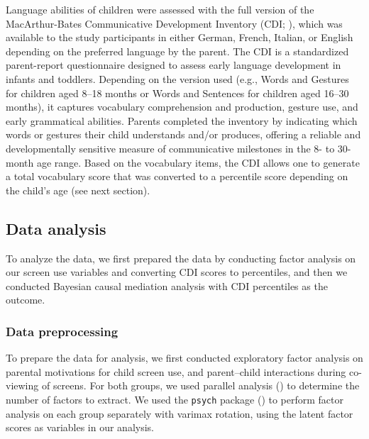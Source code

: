 \documentclass[
  man,
  floatsintext,
  longtable,
  nolmodern,
  notxfonts,
  notimes,
  colorlinks=true,linkcolor=blue,citecolor=blue,urlcolor=blue]{apa7}
\begin{document}
Language abilities of children were assessed with the full version of
the MacArthur-Bates Communicative Development Inventory (CDI;
), which was available to the study participants in either
German, French, Italian, or English depending on the preferred language
by the parent. The CDI is a standardized parent-report questionnaire
designed to assess early language development in infants and toddlers.
Depending on the version used (e.g., Words and Gestures for children
aged 8--18 months or Words and Sentences for children aged 16--30
months), it captures vocabulary comprehension and production, gesture
use, and early grammatical abilities. Parents completed the inventory by
indicating which words or gestures their child understands and/or
produces, offering a reliable and developmentally sensitive measure of
communicative milestones in the 8- to 30-month age range. Based on the
vocabulary items, the CDI allows one to generate a total vocabulary
score that was converted to a percentile score depending on the child's
age (see next section).

\subsection{Data analysis}\label{data-analysis}

To analyze the data, we first prepared the data by conducting factor
analysis on our screen use variables and converting CDI scores to
percentiles, and then we conducted Bayesian causal mediation analysis
with CDI percentiles as the outcome.

\subsubsection{Data preprocessing}\label{data-preprocessing}

To prepare the data for analysis, we first conducted exploratory factor
analysis on parental motivations for child screen use, and parent--child
interactions during co-viewing of screens. For both groups, we used
parallel analysis () to determine the number of factors to extract. We used the
\texttt{psych} package
()
to perform factor analysis on each group separately with varimax
rotation, using the latent factor scores as variables in our analysis.
\end{document}
